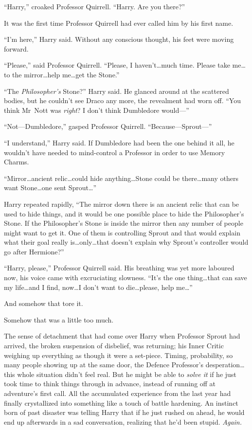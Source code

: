 “Harry,” croaked Professor Quirrell. “Harry. Are you there?”

It was the first time Professor Quirrell had ever called him by his first name.

“I’m here,” Harry said. Without any conscious thought, his feet were moving forward.

“Please,” said Professor Quirrell. “Please, I haven’t…much time. Please take me…to the mirror…help me…get the Stone.”

“The \emph{Philosopher’s} Stone?” Harry said. He glanced around at the scattered bodies, but he couldn’t see Draco any more, the revealment had worn off. “You think Mr~Nott was \emph{right}? I don’t think Dumbledore would—”

“Not—Dumbledore,” gasped Professor Quirrell. “Because—Sprout—”

“I understand,” Harry said. If Dumbledore had been the one behind it all, he wouldn’t have needed to mind-control a Professor in order to use Memory Charms.

“Mirror…ancient relic…could hide anything…Stone could be there…many others want Stone…one sent Sprout…”

Harry repeated rapidly, “The mirror down there is an ancient relic that can be used to hide things, and it would be one possible place to hide the Philosopher’s Stone. If the Philosopher’s Stone is inside the mirror then any number of people might want to get it. One of them is controlling Sprout and that would explain what their goal really is…only…that doesn’t explain why Sprout’s controller would go after Hermione?”

“Harry, please,” Professor Quirrell said. His breathing was yet more laboured now, his voice came with excruciating slowness. “It’s the one thing…that can save my life…and I find, now…I don’t want to die…please, help me…”

And somehow that tore it.

Somehow that was a little too much.

The sense of detachment that had come over Harry when Professor Sprout had arrived, the broken suspension of disbelief, was returning; his Inner Critic weighing up everything as though it were a set-piece. Timing, probability, so many people showing up at the same door, the Defence Professor’s desperation…this whole situation didn’t feel real. But he might be able to \emph{solve it} if he just took time to think things through in advance, instead of running off at adventure’s first call. All the accumulated experience from the last year had finally crystallized into something like a touch of battle hardening. An instinct born of past disaster was telling Harry that if he just rushed on ahead, he would end up afterwards in a sad conversation, realizing that he’d been stupid. \emph{Again.}

